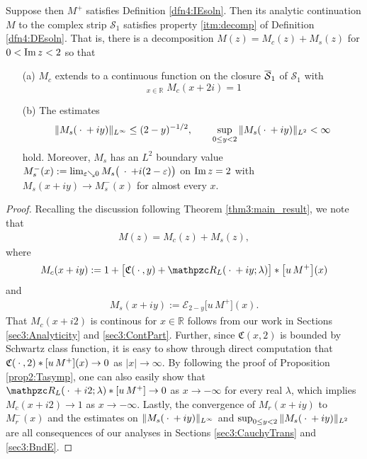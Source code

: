 \documentclass[../dissertation.tex]{subfiles}
\begin{document}
\begin{lma}\label{lma4:IEtoDE4}
	Suppose then $M^+$ satisfies Definition \ref{dfn4:IEsoln}. Then 
	its analytic continuation $M$ to the complex strip $\mathcal S_1$
	satisfies property \ref{itm:decomp} of Definition \ref{dfn4:DEsoln}.
	That is, there is a decomposition $M(z) = M_c(z) + M_s(z)$ for 
	$0 < \operatorname{Im}  z < 2$ so that 
	\begin{itemize}
		\item[(a)] $M_c$ extends to a continuous function on the closure
			$\overline{\mathcal S}_1$ of $\mathcal S_1$ with 
			\[
				\mathop{\lim_{x\to-\infty}}_{x\in \mathbb R} M_c(x+2i) = 1	
			\]
		\item[(b)] The estimates
			\[
				\|M_s(\kern 0.5ex \cdot \kern 0.5ex+iy)\|_{L^\infty} \leq (2-y)^{-1/2}, \qquad
				\sup_{0\leq y < 2} \|M_s(\kern 0.5ex \cdot \kern 0.5ex+iy)\|_{L^2} < \infty
			\]
			hold. Moreover, $M_s$ has an $L^2$ boundary value 
			$M_s^-(x):= \lim_{\varepsilon \searrow 0} M_s\big(\kern 0.5ex \cdot \kern 0.5ex+i(2-\varepsilon)\big)$
			on $\operatorname{Im} z = 2$ with $M_s(x+iy) \to M_s^-(x)$ for almost every
			$x$.
	\end{itemize}
\end{lma}
\begin{proof}
	Recalling the discussion following Theorem \ref{thm3:main_result}, 
	we note that 
	\begin{align*}
		M(z) = M_c(z) + M_s(z),
	\end{align*}
	where 
	\begin{align*}
		M_c(x+iy) 
			:= 1 
				+ 
				\big[
					\mathfrak C(\dotarg, y) + \mathpzc R_L(\dotarg+iy; \lambda)
				\big]
				*
				\big[u\,M^+\big](x)
	\end{align*}
	and
	\begin{align*}
		M_s(x+iy)
			:= \mathcal E_{2-y} \big[u\,M^+\big](x).
	\end{align*}
	That $M_c(x+i2)$ is continous for $x \in \mathbb R$ follows from our work in 
	Sections \ref{sec3:Analyticity} and \ref{sec3:ContPart}. Further,
	since $\mathfrak C(x, 2)$ is bounded by Schwartz class function, it is easy 
	to show through direct computation that 
	$\mathfrak C(\kern 0.5ex \cdot \kern 0.5ex, 2) * [u\,M^+](x) \to 0$ as $|x| \to \infty$.
	By following the proof of Proposition \ref{prop2:Tasymp}, one can 
	also easily show that $\mathpzc R_L(\dotarg + i2; \lambda) * [u\,M^+] \to 0$
	as $x \to -\infty$ for every real $\lambda$, which implies $M_c(x+i2) \to 1$ as 
	$x \to - \infty$. Lastly, the convergence of $M_r(x+iy)$ to $M_r^-(x)$ and the 
	estimates on $\|M_s(\kern 0.5ex \cdot \kern 0.5ex+iy)\|_{L^\infty}$ and 
	$\sup_{0\leq y < 2} \|M_s(\kern 0.5ex \cdot \kern 0.5ex+iy)\|_{L^2}$ are all consequences of our 
	analyses in Sections \ref{sec3:CauchyTrans} and \ref{sec3:BndE}.
\end{proof}
\end{document}

